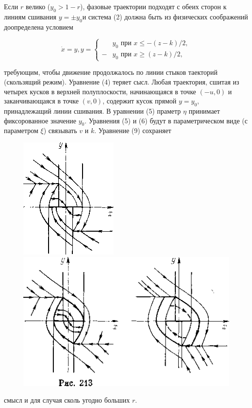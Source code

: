 \documentclass{article}
\begin{document}
Если $r$ \flqq велико \frqq ($y_{0}>1-r$), фазовые траектории подходят с 
обеих сторон к линиям сшивания $y=\pm y_{0}$и система (2) должна
быть из физических соображений доопределена условием
\begin{center}
$$
\dot{x}=y, y=
\left\{
    \begin{array}{ll}
        &y_{0}  \mbox{ при } x \leq -(z-k)/2,\\
        -&y_{0}  \mbox{ при } x \geq (z-k)/2,
    \end{array}
\right.
$$
\end{center}
требующим, чтобы движение продолжалось по линии стыков таекторий
(скользящий режим). Уравнение (4) теряет сысл. Любая 
траектория, сшитая из четырех кусков в верхней полуплоскости,
начинающаяся в точке $(-u, 0)$ и заканчивающаяся в точке
$(v, 0)$, содержит кусок прямой $y=y_{0}$, принадлежащий линии
сшивания. В уравнении (5) праметр $\eta$ принимает фиксорованное
значение $y_{0}$. Уравнения (5) и (6) будут в параметрическом
виде (с параметром $\xi$) связывать $v$ и $k$. Уравнение (9) сохраняет
\begin{figure}[h]

\centering

\includegraphics[width=0.3\linewidth]{../img/img213__1.png}
\includegraphics[width=0.6\linewidth]{../img/img213__2.png}

\label{ris:image}

\end{figure}
смысл и для случая сколь угодно больших $r$.
\end{document}
